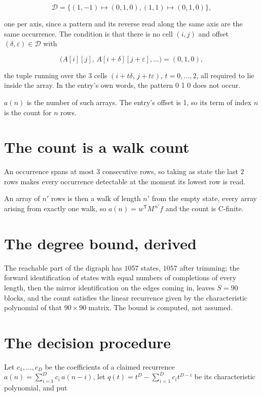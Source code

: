 \documentclass[11pt]{article}
\theoremstyle{definition}
\begin{document}
\[\mathcal{D} = \{(1,-1)\mapsto(0,1,0), (1,1)\mapsto(0,1,0)\},\]

one per axis, since a pattern and its reverse read along the same axis are the same occurrence. The condition is that there is no cell $(i,j)$ and offset $(\delta,\varepsilon)\in\mathcal{D}$ with

\[\bigl(A[i][j],\,A[i{+}\delta][j{+}\varepsilon],\dots\bigr) = (0, 1, 0),\]

the tuple running over the $3$ cells $(i+t\delta,\,j+t\varepsilon)$, $t = 0,\dots,2$, all required to lie inside the array. In the entry's own words, the pattern 0 1 0 does not occur.

$a(n)$ is the number of such arrays. The entry's offset is 1, so its term of index $n$ is the count for $n$ rows.

\section{The count is a walk count}

An occurrence spans at most $3$ consecutive rows, so taking as state the last $2$ rows makes every occurrence detectable at the moment its lowest row is read.

An array of $n'$ rows is then a walk of length $n'$ from the empty state, every array arising from exactly one walk, so $a(n) = w^{\mathsf T}M^{\,n'}f$ and the count is C-finite.

\section{The degree bound, derived}

The reachable part of the digraph has $1057$ states, $1057$ after trimming; the forward identification of states with equal numbers of completions of every length, then the mirror identification on the edges coming in, leaves $S = 90$ blocks, and the count satisfies the linear recurrence given by the characteristic polynomial of that $90\times90$ matrix. The bound is computed, not assumed.

\section{The decision procedure}

Let $c_1,\dots,c_D$ be the coefficients of a claimed recurrence $a(n) = \sum_{i=1}^{D} c_i\,a(n-i)$, let $q(t) = t^{D} - \sum_{i=1}^{D} c_i t^{D-i}$ be its characteristic polynomial, and put
\end{document}
